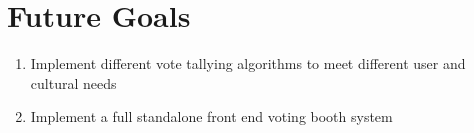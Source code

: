 \documentclass[titlepage]{article}
\begin{document}
\section{Future Goals}
\begin{enumerate}
\item Implement different vote tallying algorithms to meet different user and cultural needs
\item Implement a full standalone front end voting booth system
\end{enumerate}
\end{document}

